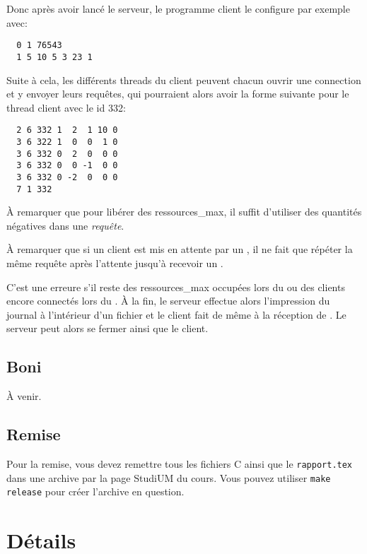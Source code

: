 \documentclass{article}
\begin{document}
Donc après avoir lancé le serveur, le programme client le configure par
exemple avec:
\begin{verbatim}
  0 1 76543 
  1 5 10 5 3 23 1 
\end{verbatim}
Suite à cela, les différents threads du client peuvent chacun ouvrir une
connection et y envoyer leurs requêtes, qui pourraient alors avoir la forme
suivante pour le thread client avec le id 332:
\begin{verbatim}
  2 6 332 1  2  1 10 0 
  3 6 322 1  0  0  1 0 
  3 6 332 0  2  0  0 0
  3 6 332 0  0 -1  0 0
  3 6 332 0 -2  0  0 0
  7 1 332 
\end{verbatim}

À remarquer que pour libérer des ressources_max, il suffit d'utiliser des
quantités négatives dans une \emph{requête}.

À remarquer que si un client est mis en attente par un , il ne fait
que répéter la même requête après l'attente jusqu'à recevoir un .

C'est une erreure s’il reste des ressources_max occupées lors du  ou des
clients encore connectés lors du .  À la fin, le serveur effectue
alors l’impression du journal à l’intérieur d’un fichier et le client fait
de même à la réception de .  Le serveur peut alors se fermer ainsi
que le client.

\subsection{Boni}

À venir. 

\subsection{Remise}

Pour la remise, vous devez remettre tous les fichiers C ainsi que le
\texttt{rapport.tex} dans une archive  par la page StudiUM du cours.  Vous pouvez utiliser \texttt{make release} pour
créer l'archive en question.  

\section{Détails}
\end{document}
